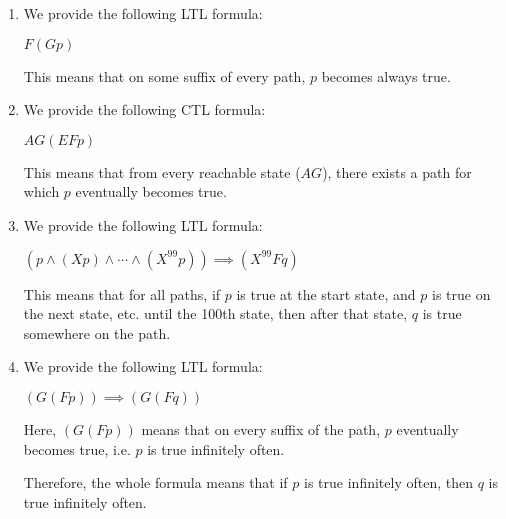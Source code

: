 


\begin{enumerate}[label=(\alph*)]

  \item
    We provide the following LTL formula:

    $F (G p)$

    This means that on some suffix of every path, $p$ becomes always true.

    \item
      We provide the following CTL formula:

      $AG (E F p)$

      This means that from every reachable state ($AG$), there exists a path for which $p$ eventually becomes true.

      \item
        We provide the following LTL formula:

        $(p \wedge (X p) \wedge \cdots \wedge (X^{99} p)) \implies (X^{99} F q)$

        This means that for all paths, if $p$ is true at the start state, and $p$ is true on the next state, etc. until the 100th state, then after that state, $q$ is true somewhere on the path.

        \item
          We provide the following LTL formula:

          $(G (F p)) \implies (G (F q))$

          Here, $(G (F p))$ means that on every suffix of the path, $p$ eventually becomes true, i.e. $p$ is true infinitely often.

          Therefore, the whole formula means that if $p$ is true infinitely often, then $q$ is true infinitely often.



        
    \end{enumerate}

